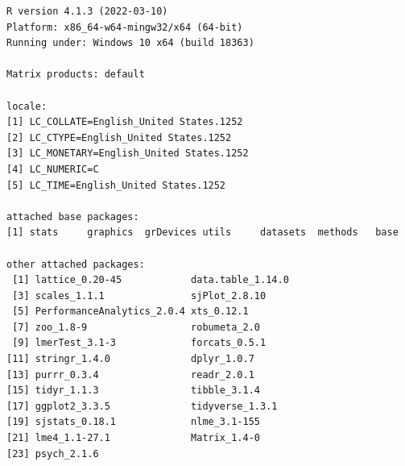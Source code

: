 \documentclass[
  11pt,
]{book}
\begin{document}
\begin{verbatim}
R version 4.1.3 (2022-03-10)
Platform: x86_64-w64-mingw32/x64 (64-bit)
Running under: Windows 10 x64 (build 18363)

Matrix products: default

locale:
[1] LC_COLLATE=English_United States.1252 
[2] LC_CTYPE=English_United States.1252   
[3] LC_MONETARY=English_United States.1252
[4] LC_NUMERIC=C                          
[5] LC_TIME=English_United States.1252    

attached base packages:
[1] stats     graphics  grDevices utils     datasets  methods   base     

other attached packages:
 [1] lattice_0.20-45            data.table_1.14.0         
 [3] scales_1.1.1               sjPlot_2.8.10             
 [5] PerformanceAnalytics_2.0.4 xts_0.12.1                
 [7] zoo_1.8-9                  robumeta_2.0              
 [9] lmerTest_3.1-3             forcats_0.5.1             
[11] stringr_1.4.0              dplyr_1.0.7               
[13] purrr_0.3.4                readr_2.0.1               
[15] tidyr_1.1.3                tibble_3.1.4              
[17] ggplot2_3.3.5              tidyverse_1.3.1           
[19] sjstats_0.18.1             nlme_3.1-155              
[21] lme4_1.1-27.1              Matrix_1.4-0              
[23] psych_2.1.6               


\end{verbatim}
\end{document}
